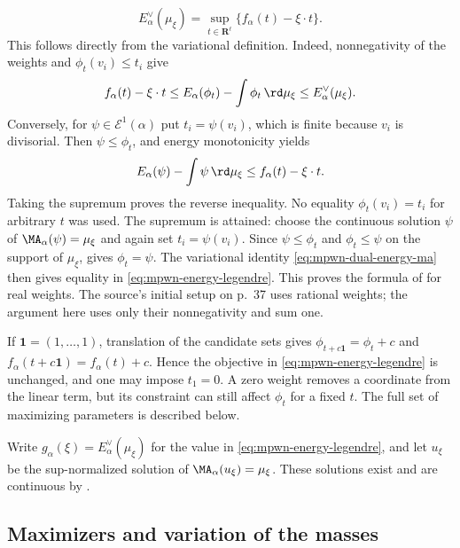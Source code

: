 \[
 E_\alpha^\vee(\mu_\xi)
    =\sup_{t\in\mathbf R^\ell}
                     \{f_\alpha(t)-\xi\cdot t\}.
\tag{62.23}\label{eq:mpwn-energy-legendre}
\]
This follows directly from the variational definition.  Indeed,
nonnegativity of the weights and $\phi_t(v_i)\leq t_i$ give
\[
 f_\alpha(t)-\xi\cdot t
 \leq E_\alpha(\phi_t)-\int\phi_t\,\rd\mu_\xi
 \leq E_\alpha^\vee(\mu_\xi).
\]
Conversely, for $\psi\in\mathcal E^1(\alpha)$ put
$t_i=\psi(v_i)$, which is finite because $v_i$ is divisorial.
Then $\psi\leq\phi_t$, and energy monotonicity yields
\[
 E_\alpha(\psi)-\int\psi\,\rd\mu_\xi
                  \leq f_\alpha(t)-\xi\cdot t.
\]
Taking the supremum proves the reverse inequality.  No equality
$\phi_t(v_i)=t_i$ for arbitrary $t$ was used.
The supremum is attained: choose the continuous solution
$\psi$ of $\MA_\alpha(\psi)=\mu_\xi$ and again set
$t_i=\psi(v_i)$.  Since $\psi\leq\phi_t$ and $\phi_t\leq\psi$
on the support of $\mu_\xi$,  gives
$\phi_t=\psi$.  The variational identity
\eqref{eq:mpwn-dual-energy-ma} then gives equality in
\eqref{eq:mpwn-energy-legendre}.  This proves the formula of \cite[Corollary~10.1.3, p.~40]{MPWN25} for real weights. The source's initial setup on p.~37 uses rational weights; the argument here uses only their nonnegativity and sum one.

If $\mathbf1=(1,\ldots,1)$, translation of the candidate sets gives
$\phi_{t+c\mathbf1}=\phi_t+c$ and
$f_\alpha(t+c\mathbf1)=f_\alpha(t)+c$.
Hence the objective in \eqref{eq:mpwn-energy-legendre} is unchanged,
and one may impose $t_1=0$. A zero weight removes a coordinate from the linear term, but its constraint can still affect $\phi_t$ for a fixed $t$. The full set of maximizing parameters is described below.

Write $g_\alpha(\xi)=E_\alpha^\vee(\mu_\xi)$ for the value in \eqref{eq:mpwn-energy-legendre}, and let $u_\xi$ be the sup-normalized solution of $\MA_\alpha(u_\xi)=\mu_\xi$. These solutions exist and are continuous by .

\subsection{Maximizers and variation of the masses}
\label{subsec:mpwn-k-mass-variation}


